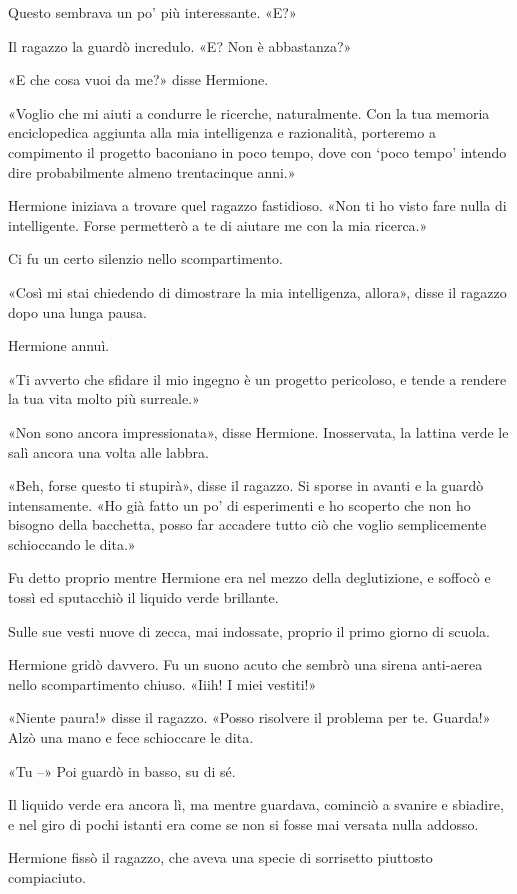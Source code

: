 Questo sembrava un po’ più interessante. «E?»

Il ragazzo la guardò incredulo. «E? Non è abbastanza?»

«E che cosa vuoi da me?» disse Hermione.

«Voglio che mi aiuti a condurre le ricerche, naturalmente. Con la tua memoria enciclopedica aggiunta alla mia intelligenza e razionalità, porteremo a compimento il progetto baconiano in poco tempo, dove con ‘poco tempo’ intendo dire probabilmente almeno trentacinque anni.»

Hermione iniziava a trovare quel ragazzo fastidioso. «Non ti ho visto fare nulla di intelligente. Forse permetterò a te di aiutare me con la mia ricerca.»

Ci fu un certo silenzio nello scompartimento.

«Così mi stai chiedendo di dimostrare la mia intelligenza, allora», disse il ragazzo dopo una lunga pausa.

Hermione annuì.

«Ti avverto che sfidare il mio ingegno è un progetto pericoloso, e tende a rendere la tua vita molto più surreale.»

«Non sono ancora impressionata», disse Hermione. Inosservata, la lattina verde le salì ancora una volta alle labbra.

«Beh, forse questo ti stupirà», disse il ragazzo. Si sporse in avanti e la guardò intensamente. «Ho già fatto un po’ di esperimenti e ho scoperto che non ho bisogno della bacchetta, posso far accadere tutto ciò che voglio semplicemente schioccando le dita.»

Fu detto proprio mentre Hermione era nel mezzo della deglutizione, e soffocò e tossì ed sputacchiò il liquido verde brillante.

Sulle sue vesti nuove di zecca, mai indossate, proprio il primo giorno di scuola.

Hermione gridò davvero. Fu un suono acuto che sembrò una sirena anti-aerea nello scompartimento chiuso. «Iiih! I miei vestiti!»

«Niente paura!» disse il ragazzo. «Posso risolvere il problema per te. Guarda!» Alzò una mano e fece schioccare le dita.

«Tu –» Poi guardò in basso, su di sé.

Il liquido verde era ancora lì, ma mentre guardava, cominciò a svanire e sbiadire, e nel giro di pochi istanti era come se non si fosse mai versata nulla addosso.

Hermione fissò il ragazzo, che aveva una specie di sorrisetto piuttosto compiaciuto.

